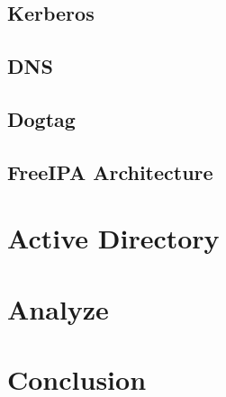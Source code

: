 
\section{Kerberos}
\section{DNS}
\section{Dogtag}
\section{FreeIPA Architecture}

\chapter{Active Directory}
\chapter{Analyze}
\chapter{Conclusion}


